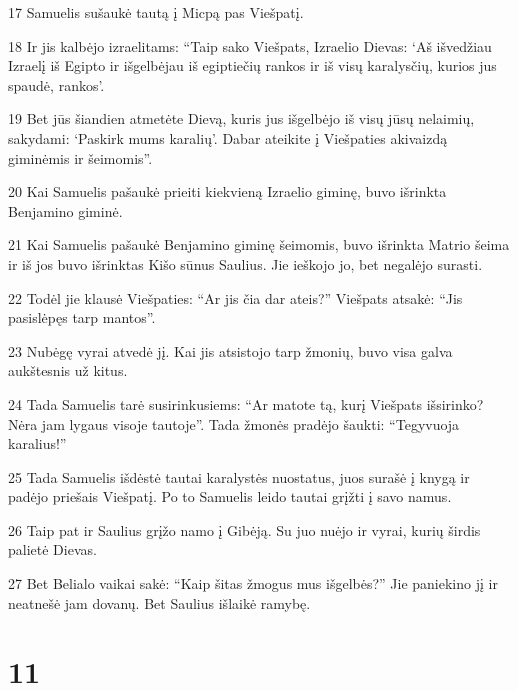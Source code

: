 \par 17 Samuelis sušaukė tautą į Micpą pas Viešpatį. 
\par 18 Ir jis kalbėjo izraelitams: “Taip sako Viešpats, Izraelio Dievas: ‘Aš išvedžiau Izraelį iš Egipto ir išgelbėjau iš egiptiečių rankos ir iš visų karalysčių, kurios jus spaudė, rankos’. 
\par 19 Bet jūs šiandien atmetėte Dievą, kuris jus išgelbėjo iš visų jūsų nelaimių, sakydami: ‘Paskirk mums karalių’. Dabar ateikite į Viešpaties akivaizdą giminėmis ir šeimomis”. 
\par 20 Kai Samuelis pašaukė prieiti kiekvieną Izraelio giminę, buvo išrinkta Benjamino giminė. 
\par 21 Kai Samuelis pašaukė Benjamino giminę šeimomis, buvo išrinkta Matrio šeima ir iš jos buvo išrinktas Kišo sūnus Saulius. Jie ieškojo jo, bet negalėjo surasti. 
\par 22 Todėl jie klausė Viešpaties: “Ar jis čia dar ateis?” Viešpats atsakė: “Jis pasislėpęs tarp mantos”. 
\par 23 Nubėgę vyrai atvedė jį. Kai jis atsistojo tarp žmonių, buvo visa galva aukštesnis už kitus. 
\par 24 Tada Samuelis tarė susirinkusiems: “Ar matote tą, kurį Viešpats išsirinko? Nėra jam lygaus visoje tautoje”. Tada žmonės pradėjo šaukti: “Tegyvuoja karalius!” 
\par 25 Tada Samuelis išdėstė tautai karalystės nuostatus, juos surašė į knygą ir padėjo priešais Viešpatį. Po to Samuelis leido tautai grįžti į savo namus. 
\par 26 Taip pat ir Saulius grįžo namo į Gibėją. Su juo nuėjo ir vyrai, kurių širdis palietė Dievas. 
\par 27 Bet Belialo vaikai sakė: “Kaip šitas žmogus mus išgelbės?” Jie paniekino jį ir neatnešė jam dovanų. Bet Saulius išlaikė ramybę.



\chapter{11}


